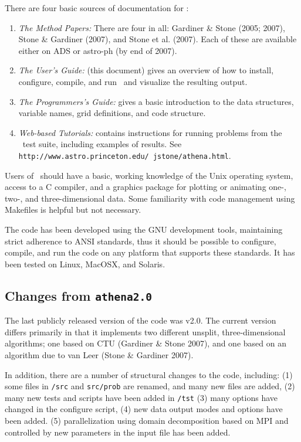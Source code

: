 There are four basic sources of documentation for \ath:
\begin{enumerate}

\item {\it The Method Papers:} There are four in all: Gardiner \& Stone
(2005; 2007), Stone \& Gardiner (2007), and Stone et al. (2007).  Each of
these are available either on ADS or astro-ph (by end of 2007).

\item {\it The User's Guide:} (this document) gives an overview of how to
install, configure, compile, and run \ath\ and visualize the resulting output.

\item {\it The Programmers's Guide:} gives a basic introduction to the 
data structures, variable names, grid definitions, and code structure.

\item {\it Web-based Tutorials:} contains instructions
for running problems from the \ath\ test suite, including examples of results.
See {\tt http://www.astro.princeton.edu/~jstone/athena.html}.

\end{enumerate}
Users of \ath\ should have a basic, working knowledge of the Unix
operating system, access to a C compiler, and a graphics package for
plotting or animating one-, two-, and three-dimensional data.  Some familiarity
with code management using Makefiles is helpful but not necessary.

The code has been developed using the GNU development tools,
maintaining strict adherence to ANSI standards, thus it should be possible
to configure, compile, and run the code on any platform that supports these
standards.  It has been tested on Linux, MacOSX, and Solaris.

\subsection{Changes from {\tt athena2.0}}

The last publicly released version of the code was v2.0.  The current
version differs primarily in that it implements two different unsplit,
three-dimensional algorithms; one based on CTU (Gardiner \& Stone 2007),
and one based on an algorithm due to van Leer (Stone \& Gardiner 2007).

In addition, there are a number of structural changes to the code, including:
(1) some files in {\tt /src} and {\tt src/prob} are renamed, and many new files are added,
(2) many new tests and scripts have been added in {\tt /tst}
(3) many options have changed in the configure script,
(4) new data output modes and options have been added.
(5) parallelization using domain decomposition based on MPI and controlled
by new parameters in the input file has been added.


